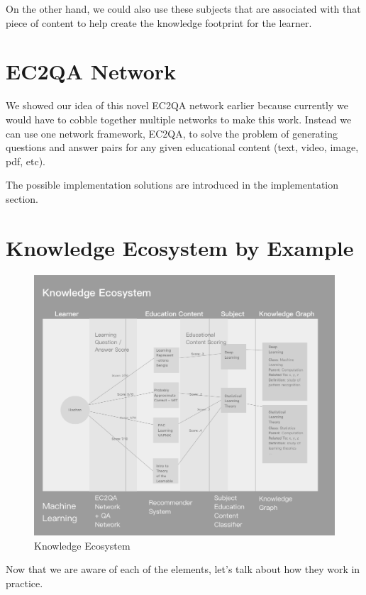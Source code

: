 \documentclass[]{book}
\theoremstyle{definition}
\theoremstyle{definition}
\theoremstyle{definition}
\theoremstyle{remark}
\begin{document}
On the other hand, we could also use these subjects that are associated
with that piece of content to help create the knowledge footprint for
the learner.

\section{EC2QA Network}\label{ec2qa-network}

We showed our idea of this novel EC2QA network earlier because currently
we would have to cobble together multiple networks to make this work.
Instead we can use one network framework, EC2QA, to solve the problem of
generating questions and answer pairs for any given educational content
(text, video, image, pdf, etc).

The possible implementation solutions are introduced in the
implementation section.

\section{Knowledge Ecosystem by
Example}\label{knowledge-ecosystem-by-example}

\begin{figure}
\centering
\includegraphics{img/knowledgeEcosystem.png}
\caption{Knowledge Ecosystem}
\end{figure}

Now that we are aware of each of the elements, let's talk about how they
work in practice.
\end{document}
